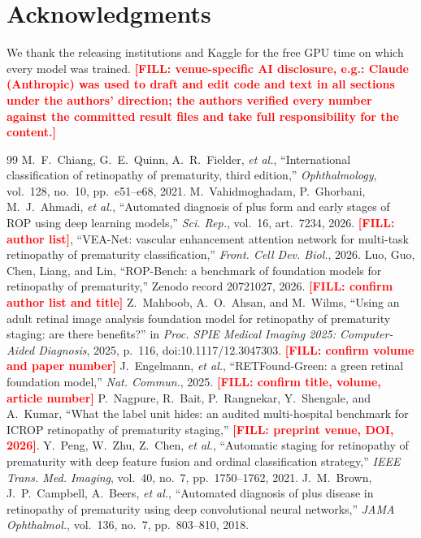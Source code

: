 \documentclass[conference]{IEEEtran}
\newcommand{\FILL}[1]{\textcolor{red}{\textbf{[FILL: #1]}}}
\begin{document}
\section*{Acknowledgments}
We thank the releasing institutions and Kaggle for the free GPU time on which every model was trained. \FILL{venue-specific AI disclosure, e.g.: Claude (Anthropic) was used to draft and edit code and text in all sections under the authors' direction; the authors verified every number against the committed result files and take full responsibility for the content.}

\begin{thebibliography}{99}
 M.~F.~Chiang, G.~E.~Quinn, A.~R.~Fielder, \emph{et al.}, ``International classification of retinopathy of prematurity, third edition,'' \emph{Ophthalmology}, vol.~128, no.~10, pp.~e51--e68, 2021.
 M.~Vahidmoghadam, P.~Ghorbani, M.~J.~Ahmadi, \emph{et al.}, ``Automated diagnosis of plus form and early stages of ROP using deep learning models,'' \emph{Sci. Rep.}, vol.~16, art.~7234, 2026.
 \FILL{author list}, ``VEA-Net: vascular enhancement attention network for multi-task retinopathy of prematurity classification,'' \emph{Front. Cell Dev. Biol.}, 2026.
 Luo, Guo, Chen, Liang, and Lin, ``ROP-Bench: a benchmark of foundation models for retinopathy of prematurity,'' Zenodo record 20721027, 2026. \FILL{confirm author list and title}
 Z.~Mahboob, A.~O.~Ahsan, and M.~Wilms, ``Using an adult retinal image analysis foundation model for retinopathy of prematurity staging: are there benefits?'' in \emph{Proc. SPIE Medical Imaging 2025: Computer-Aided Diagnosis}, 2025, p.~116, doi:10.1117/12.3047303. \FILL{confirm volume and paper number}
 J.~Engelmann, \emph{et al.}, ``RETFound-Green: a green retinal foundation model,'' \emph{Nat. Commun.}, 2025. \FILL{confirm title, volume, article number}
 P.~Nagpure, R.~Bait, P.~Rangnekar, Y.~Shengale, and A.~Kumar, ``What the label unit hides: an audited multi-hospital benchmark for ICROP retinopathy of prematurity staging,'' \FILL{preprint venue, DOI, 2026}.
 Y.~Peng, W.~Zhu, Z.~Chen, \emph{et al.}, ``Automatic staging for retinopathy of prematurity with deep feature fusion and ordinal classification strategy,'' \emph{IEEE Trans. Med. Imaging}, vol.~40, no.~7, pp.~1750--1762, 2021.
 J.~M.~Brown, J.~P.~Campbell, A.~Beers, \emph{et al.}, ``Automated diagnosis of plus disease in retinopathy of prematurity using deep convolutional neural networks,'' \emph{JAMA Ophthalmol.}, vol.~136, no.~7, pp.~803--810, 2018.

\end{thebibliography}
\end{document}
